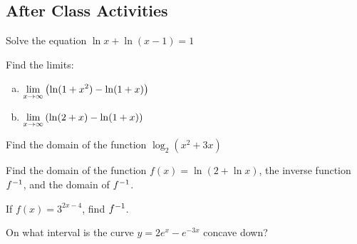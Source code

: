 \documentclass[notes]{subfiles}
\begin{document}
	\subsection*{After Class Activities}
		\begin{ex}
			Solve the equation $\ln x + \ln (x-1) = 1$
		\end{ex}
			\newpage
			
		\begin{ex}
			Find the limits:
			\begin{enumerate}[(a)]
				\item $\displaystyle \lim_{x\to \infty}\left( \ln(1+x^2) - \ln(1+x)\right)$
					
				\item $\displaystyle \lim_{x\to \infty}\left( \ln(2+x) - \ln(1+x)\right)$
			\end{enumerate}
		\end{ex}
		
		\begin{ex}
			Find the domain of the function $\log_2(x^2 + 3x)$
		\end{ex}
			\vs{1}
			\newpage
			
		\begin{ex}
			Find the domain of the function $f(x) = \ln (2+\ln x)$, the inverse function $f^{-1}$, and the domain of $f^{-1}$.
		\end{ex}
			
		\begin{ex}
			If $f(x) = 3^{2x-4}$, find $f^{-1}$.
		\end{ex}
			
		\begin{ex}
			On what interval is the curve $y = 2e^x - e^{-3x}$ concave down?
		\end{ex}
				
\clearpage
\end{document}
